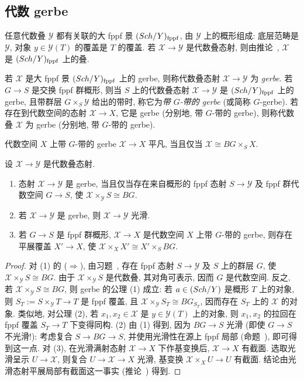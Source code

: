 \subsection{代数 gerbe}\label{src:7.4.3-subsection}
任意代数叠 $\mathcal Y$ 都有关联的大 fppf 景 $(Sch/Y)_{\mathrm{fppf}}$, 由 $\mathcal Y$ 上的概形组成: 底层范畴是 $\mathcal Y$, 对象 $y\in\mathcal Y(T)$ 的覆盖是 $T$ 的覆盖. 若 $\mathcal X\to\mathcal Y$ 是代数叠态射, 则由推论~, $\mathcal X$ 是 $(Sch/Y)_{\mathrm{fppf}}$ 上的叠.
\begin{definition}\label{src:7.4.16}
若 $\mathcal X$ 是大 fppf 景 $(Sch/Y)_{\mathrm{fppf}}$ 上的 gerbe, 则称代数叠态射 $\mathcal X\to\mathcal Y$ 为 \emph{gerbe}. 若 $G\to S$ 是交换 fppf 群概形, 则当 $S$ 上的代数叠态射 $\mathcal X\to\mathcal Y$ 是 $(Sch/Y)_{\mathrm{fppf}}$ 上的 gerbe, 且带群层 $G\times_S\mathcal Y$ 给出的带时, 称它为\emph{带 $G$-带的 gerbe} (或简称 $G$-gerbe). 若存在到代数空间的态射 $\mathcal X\to X$, 它是 gerbe (分别地, 带 $G$-带的 gerbe), 则称代数叠 $\mathcal X$ 为 gerbe (分别地, 带 $G$-带的 gerbe).
\end{definition}
代数空间 $X$ 上带 $G$-带的 gerbe $\mathcal X\to X$ 平凡, 当且仅当 $\mathcal X\cong BG\times_S X$.
\begin{proposition}\label{src:7.4.17}
设 $\mathcal X\to\mathcal Y$ 是代数叠态射.
\begin{enumerate}[(1)]
\item 态射 $\mathcal X\to\mathcal Y$ 是 gerbe, 当且仅当存在来自概形的 fppf 态射 $S\to\mathcal Y$ 及 fppf 群代数空间 $G\to S$, 使 $\mathcal X\times_{\mathcal Y}S\cong BG$.
\item 若 $\mathcal X\to\mathcal Y$ 是 gerbe, 则 $\mathcal X\to\mathcal Y$ 光滑.
\item 若 $G\to S$ 是 fppf 群概形, $\mathcal X\to X$ 是代数空间 $X$ 上带 $G$-带的 gerbe, 则存在平展覆盖 $X'\to X$, 使 $\mathcal X\times_X X'\cong X'\times_S BG$.
\end{enumerate}
\end{proposition}
\begin{proof}
对 (1) 的 ($\Rightarrow$), 由习题~, 存在 fppf 态射 $S\to\mathcal Y$ 及 $S$ 上的群层 $G$, 使 $\mathcal X\times_{\mathcal Y}S\cong BG$. 由于 $\mathcal X\times_{\mathcal Y}S$ 是代数叠, 其对角可表示, 因而 $G$ 是代数空间. 反之, 若 $\mathcal X\times_{\mathcal Y}S\cong BG$, 则 gerbe 的公理 (1) 成立: 若 $a\in(Sch/Y)$ 是概形 $T$ 上的对象, 则 $S_T:=S\times_{\mathcal Y}T\to T$ 是 fppf 覆盖, 且 $\mathcal X\times_{\mathcal Y}S_T\cong BG_{S_T}$, 因而存在 $S_T$ 上的 $\mathcal X$ 的对象. 类似地, 对公理 (2), 若 $x_1,x_2\in\mathcal X$ 是 $y\in\mathcal Y(T)$ 上的对象, 则 $x_1,x_2$ 的拉回在 fppf 覆盖 $S_T\to T$ 下变得同构. (2) 由 (1) 得到, 因为 $BG\to S$ 光滑 (即使 $G\to S$ 不光滑!): 考虑复合 $S\to BG\to S$, 并使用光滑性在源上 fppf 局部 (命题~), 即可得到这一点. 对 (3), 在光滑满射态射 $\mathcal X\to X$ 下作基变换后, $\mathcal X\to X$ 有截面. 选取光滑呈示 $U\to\mathcal X$, 则复合 $U\to\mathcal X\to X$ 光滑, 基变换 $\mathcal X\times_X U\to U$ 有截面. 结论由光滑态射平展局部有截面这一事实 (推论~) 得到.
\end{proof}
